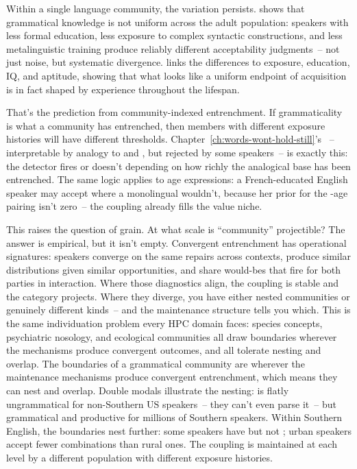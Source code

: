 Within a single language community, the variation persists. \textcite{dabrowska2012} shows that grammatical knowledge is not uniform across the adult population: speakers with less formal education, less exposure to complex syntactic constructions, and less metalinguistic training produce reliably different acceptability judgments~-- not just noise, but systematic divergence. \textcite{dabrowska2018} links the differences to exposure, education, IQ, and aptitude, showing that what looks like a uniform endpoint of acquisition is in fact shaped by experience throughout the lifespan.

That's the prediction from community-indexed entrenchment. If grammaticality is what a community has entrenched, then members with different exposure histories will have different thresholds. Chapter~\ref{ch:words-wont-hold-still}'s ~-- interpretable by analogy to  and , but rejected by some speakers~-- is exactly this: the detector fires or doesn't depending on how richly the analogical base has been entrenched. The same logic applies to age expressions: a French-educated English speaker may accept \ungram{} where a monolingual wouldn't, because her prior for the -age pairing isn't zero~-- the  coupling already fills the value niche.

This raises the question of grain. At what scale is \enquote{community} projectible? The answer is empirical, but it isn't empty. Convergent entrenchment has operational signatures: speakers converge on the same repairs across contexts, produce similar distributions given similar opportunities, and share would-bes that fire for both parties in interaction. Where those diagnostics align, the coupling is stable and the category projects. Where they diverge, you have either nested communities or genuinely different kinds~-- and the maintenance structure tells you which. This is the same individuation problem every HPC domain faces: species concepts, psychiatric nosology, and ecological communities all draw boundaries wherever the mechanisms produce convergent outcomes, and all tolerate nesting and overlap. The boundaries of a grammatical community are wherever the maintenance mechanisms produce convergent entrenchment, which means they can nest and overlap. Double modals illustrate the nesting:  is flatly ungrammatical for non-Southern US speakers~-- they can't even parse it~-- but grammatical and productive for millions of Southern speakers. Within Southern English, the boundaries nest further: some speakers have  but not ; urban speakers accept fewer combinations than rural ones. The coupling is maintained at each level by a different population with different exposure histories.

